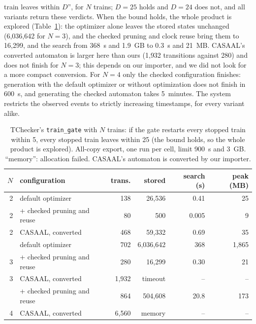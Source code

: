 train leaves within $D$'', for $N$ trains; $D=25$ holds and $D=24$ does not, and all variants return these verdicts. When the bound holds, the whole product is explored (Table~\ref{tab:train-gate}): the optimizer alone leaves the stored states unchanged (6{,}036{,}642 for $N=3$), and the checked pruning and clock reuse bring them to 16{,}299, and the search from 368~s and 1.9~GB to 0.3~s and 21~MB. CASAAL's converted automaton is larger here than ours (1{,}932 transitions against 280) and does not finish for $N=3$; this depends on our importer, and we did not look for a more compact conversion. For $N=4$ only the checked configuration finishes: generation with the default optimizer or without optimization does not finish in 600~s, and generating the checked automaton takes 5~minutes. The system restricts the observed events to strictly increasing timestamps, for every variant alike.

\begin{table}[tbp]
\centering
\caption{TChecker's \texttt{train\_gate} with $N$ trains: if the gate restarts every stopped train within 5, every stopped train leaves within 25 (the bound holds, so the whole product is explored). All-copy export, one run per cell, limit 900~s and 3~GB. ``memory'': allocation failed. CASAAL's automaton is converted by our importer.}
\label{tab:train-gate}
\small
\begin{tabular}{rlrrrr}
\toprule
$N$ & configuration & trans. & stored & search (s) & peak (MB)\\
\midrule
2 & default optimizer & 138 & 26{,}536 & 0.41 & 25\\
2 & + checked pruning and reuse & 80 & 500 & 0.005 & 9\\
2 & CASAAL, converted & 468 & 59{,}332 & 0.69 & 35\\
\addlinespace
3 & default optimizer & 702 & 6{,}036{,}642 & 368 & 1{,}865\\
3 & + checked pruning and reuse & 280 & 16{,}299 & 0.30 & 21\\
3 & CASAAL, converted & 1{,}932 & timeout & -- & --\\
\addlinespace
4 & + checked pruning and reuse & 864 & 504{,}608 & 20.8 & 173\\
4 & CASAAL, converted & 6{,}560 & memory & -- & --\\
\bottomrule
\end{tabular}
\end{table}

